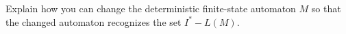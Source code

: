 \documentclass[../main.tex]{subfiles}
\begin{document}
Explain how you can change the deterministic finite-state automaton $M$ so that the changed automaton recognizes the set $I^\ast - L(M)$.

\solution
\end{document}
